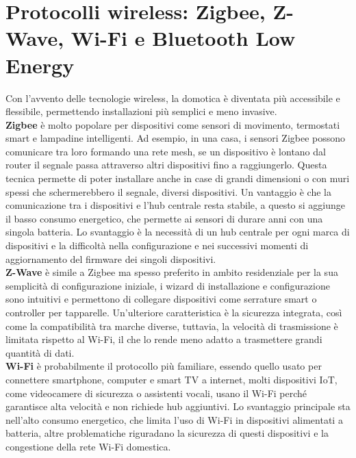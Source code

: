 \section{Protocolli wireless: Zigbee, Z-Wave, Wi-Fi e Bluetooth Low Energy}
Con l’avvento delle tecnologie wireless, la domotica è diventata più accessibile e flessibile, permettendo installazioni più semplici e meno invasive.\\

\textbf{Zigbee} è molto popolare per dispositivi come sensori di movimento, termostati smart e lampadine intelligenti. Ad esempio, in una casa, i sensori Zigbee possono comunicare tra loro formando una rete mesh,  se un dispositivo è lontano dal router il segnale passa attraverso altri dispositivi fino a raggiungerlo. Questa tecnica permette di poter installare anche in case di grandi dimensioni o con muri spessi che schermerebbero il segnale, diversi dispositivi.
Un vantaggio è che la comunicazione tra i dispositivi e l'hub centrale resta stabile, a questo si aggiunge il basso consumo energetico, che permette ai sensori di durare anni con una singola batteria. 
Lo svantaggio è la necessità di un hub centrale per ogni marca di dispositivi e la difficoltà nella configurazione e nei successivi momenti di aggiornamento del firmware dei singoli dispositivi.\\

\textbf{Z-Wave} è simile a Zigbee ma spesso preferito in ambito residenziale per la sua semplicità di configurazione iniziale, i wizard di installazione e configurazione sono intuitivi e permettono di collegare dispositivi come serrature smart o controller per tapparelle. 
Un'ulteriore caratteristica è la sicurezza integrata, così come la compatibilità tra marche diverse, tuttavia, la velocità di trasmissione è limitata rispetto al Wi-Fi, il che lo rende meno adatto a trasmettere grandi quantità di dati.\\

\textbf{Wi-Fi} è probabilmente il protocollo più familiare, essendo quello usato per connettere smartphone, computer e smart TV a internet, molti dispositivi IoT, come videocamere di sicurezza o assistenti vocali, usano il Wi-Fi perché garantisce alta velocità e non richiede hub aggiuntivi. 
Lo svantaggio principale sta nell’alto consumo energetico, che limita l’uso di Wi-Fi in dispositivi alimentati a batteria, altre problematiche riguradano la sicurezza di questi dispositivi e la congestione della rete Wi-Fi domestica.\\

